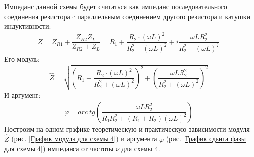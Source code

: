 \documentclass[a4paper, usenames, dvipsnames]{article}
\begin{document}
\begin{enumerate}
          Импеданс данной схемы будет считаться как импеданс
          последовательного соединения резистора
          с параллельным соединением другого резистора и катушки индуктивности:
          \begin{gather*}
              Z = Z_{R1} + \dfrac{Z_{R2} Z_L}{Z_{R2} + Z_L} = R_1 + \dfrac{R_2 \cdot (\omega L)^2}{R_2^2 + (\omega L)^2} + i \dfrac{\omega L R_2^2}{R_2^2 + (\omega L)^2}
          \end{gather*}
          Его модуль:
          \begin{gather*}
              \hat{Z} = \sqrt{\left(R_1 + \dfrac{R_2 \cdot (\omega L)^2}{R_2^2 + (\omega L)^2}\right)^2 + \left(\dfrac{\omega L R_2^2}{R_2^2 + (\omega L)^2}\right)^2}
          \end{gather*}
          И аргумент:
          \begin{gather*}
              \varphi = arc\ tg\left(\dfrac{\omega L R_2^2}{R_1 R_2^2 + (R_1 + R_2) (\omega L)^2}\right)
          \end{gather*}
          Построим на одном графике теоретическую и практическую зависимости
          модуля $\hat{Z}$ (рис. \ref{График модуля для схемы 4})
          и аргумента $\varphi$ (рис. \ref{График сдвига фазы для схемы 4})
          импеданса от частоты $\nu$ для схемы 4.
          \begin{figure}[h]
              \begin{subfigure}{0.49\textwidth}
                  \centering\noindent

\end{subfigure}
\end{figure}
\end{enumerate}
\end{document}
